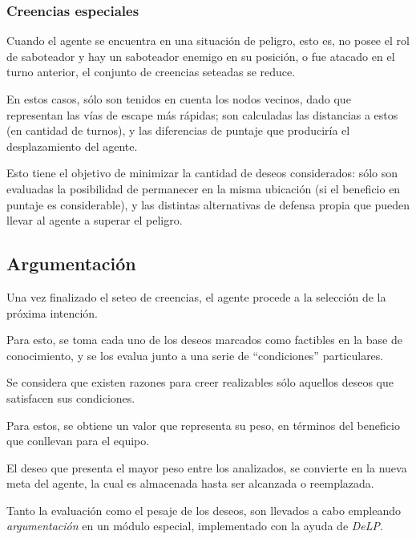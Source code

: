 \subsubsection{Creencias especiales} 
\label{sec:creencias_especiales}



Cuando el agente se encuentra en una situación de peligro, esto es, no
posee el rol de saboteador y hay un saboteador enemigo en su
posición, o fue atacado en el turno anterior, el conjunto de
creencias seteadas se reduce. 

En estos casos, sólo son tenidos en
cuenta los nodos vecinos, dado que representan las vías de escape más
rápidas; son calculadas las distancias a estos (en cantidad de
turnos), y las diferencias de puntaje que produciría el
desplazamiento del agente. 

Esto tiene el objetivo de minimizar la
cantidad de deseos considerados: sólo son evaluadas la posibilidad de
permanecer en la misma ubicación (si el beneficio en puntaje es
considerable), y las distintas alternativas de defensa propia que
pueden llevar al agente a superar el peligro.



\subsection{Argumentación}
\label{sec:argumentacion}



Una vez finalizado el seteo de creencias, el agente procede a la
selección de la próxima intención. 

Para esto, se toma cada uno de los
deseos marcados como factibles en la base de conocimiento, y se los
evalua junto a una serie de ``condiciones'' particulares. 

Se
considera que existen razones para creer realizables sólo aquellos
deseos que satisfacen sus condiciones. 

Para estos, se obtiene un
valor que representa su peso, en términos del beneficio que conllevan
para el equipo. 

El deseo que presenta el mayor peso entre los
analizados, se convierte en la nueva meta del agente, la cual es
almacenada hasta ser alcanzada o reemplazada.



Tanto la evaluación como el pesaje de los deseos, son llevados a cabo
empleando \textit{argumentación} en un módulo especial, implementado
con la ayuda de \textit{DeLP}.



